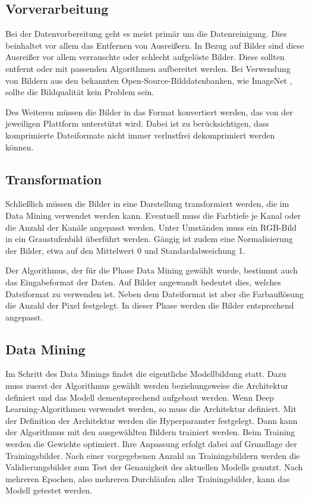 \subsection{Vorverarbeitung}

Bei der Datenvorbereitung geht es meist primär um die Datenreinigung. Dies beinhaltet vor allem das Entfernen von Ausreißern. In Bezug auf Bilder sind diese Ausreißer vor allem verrauschte oder schlecht aufgelöste Bilder. Diese sollten entfernt oder mit passenden Algorithmen aufbereitet werden. Bei Verwendung von Bildern aus den bekannten Open-Source-Bilddatenbanken, wie ImageNet \cite{Deng:2009},  sollte die Bildqualität kein Problem sein.

Des Weiteren müssen die Bilder in das Format konvertiert werden, das von der jeweiligen Plattform unterstützt wird. Dabei ist zu berücksichtigen, dass komprimierte Dateiformate nicht immer verlustfrei dekomprimiert werden können.

\subsection{Transformation}

Schließlich müssen die Bilder in eine Darstellung transformiert werden, die im Data Mining verwendet werden kann. Eventuell muss die Farbtiefe je Kanal oder die Anzahl der Kanäle angepasst werden. Unter Umständen muss ein RGB-Bild in ein Graustufenbild überführt werden. Gängig ist zudem eine Normalisierung der Bilder, etwa auf den Mittelwert 0 und Standardabweichung 1.

Der Algorithmus, der für die Phase Data Mining gewählt wurde, bestimmt auch das Eingabeformat der Daten. Auf Bilder angewandt bedeutet dies, welches Dateiformat zu verwenden ist. Neben dem Dateiformat ist aber die Farbauflösung die Anzahl der Pixel festgelegt. In dieser Phase werden die Bilder entsprechend angepasst.


\subsection{Data Mining}

Im Schritt des Data Minings findet die eigentliche Modellbildung statt. Dazu muss zuerst der Algorithmus gewählt werden beziehungsweise die Architektur definiert und das Modell dementsprechend aufgebaut werden. Wenn Deep Learning-Algorithmen verwendet werden, so muss die Architektur definiert. Mit der Definition der Architektur werden die Hyperparamter festgelegt.  Dann kann der Algorithmus mit den ausgewählten Bildern trainiert werden. Beim Training werden die Gewichte optimiert. Ihre Anpassung erfolgt dabei auf Grundlage der Trainingsbilder. Nach einer vorgegebenen Anzahl an Trainingsbildern werden die Validierungsbilder zum Test der Genauigkeit des aktuellen Modells genutzt. Nach mehreren Epochen, also mehreren Durchläufen aller Trainingsbilder, kann das Modell getestet werden.


